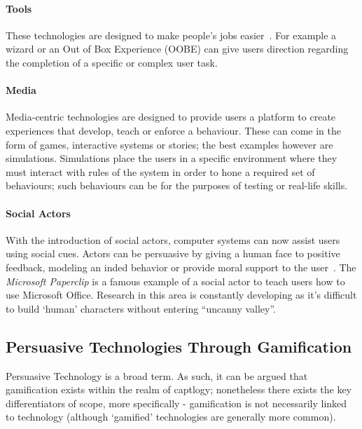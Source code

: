 \paragraph{Tools}
These technologies are designed to make people's jobs easier~\cite{fogg}. For example a wizard or an Out of Box Experience (OOBE) can give users direction regarding the completion of a specific or complex user task.
\paragraph{Media}
Media-centric technologies are designed to provide users a platform to create experiences that develop, teach or enforce a behaviour. These can come in the form of games, interactive systems or stories;  the best examples however are simulations. Simulations place the users in a specific environment where they must interact with rules of the system in order to hone a required set of behaviours; such behaviours can be for the purposes of testing or real-life skills. 
\paragraph{Social Actors}
With the introduction of social actors, computer systems can now assist users using social cues. Actors can be persuasive by giving a human face to positive feedback, modeling an inded behavior or provide moral support to the user~\cite{fogg}. The \emph{Microsoft Paperclip} is a famous example of a social actor to teach users how to use Microsoft Office. Research in this area is constantly developing as it's difficult to build `human' characters without entering ``uncanny valley''.
 

\subsection{Persuasive Technologies Through Gamification}
\label{sec:piano}
Persuasive Technology is a broad term. As such, it can be argued that gamification exists within the realm of captlogy; nonetheless there exists the key differentiators of scope, more specifically - gamification is not necessarily linked to technology (although `gamified' technologies are generally more common).


